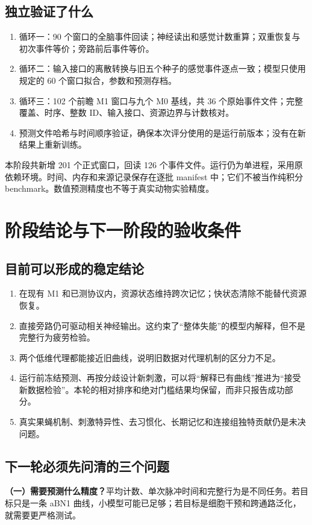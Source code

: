 \documentclass[UTF8,a4paper,zihao=-4,fontset=none]{ctexart}
\begin{document}
\subsection{独立验证了什么}
\begin{enumerate}
\item 循环一：90 个窗口的全脑事件回读；神经读出和感觉计数重算；双重恢复与初次事件等价；旁路前后事件等价。
\item 循环二：输入接口的离散转换与旧五个种子的感觉事件逐点一致；模型只使用规定的 60 个窗口拟合，参数和预测存档。
\item 循环三：102 个前瞻 M1 窗口与九个 M0 基线，共 36 个原始事件文件；完整覆盖、时序、整数 ID、输入接口、资源边界与计数核对。
\item 预测文件哈希与时间顺序验证，确保本次评分使用的是运行前版本；没有在新结果上重新训练。
\end{enumerate}

本阶段共新增 201 个正式窗口，回读 126 个事件文件。运行仍为单进程，采用原依赖环境。时间、内存和来源记录保存在逐批 manifest 中；它们不被当作纯积分 benchmark。数值预测精度也不等于真实动物实验精度。

\section{阶段结论与下一阶段的验收条件}
\subsection{目前可以形成的稳定结论}
\begin{enumerate}
\item 在现有 M1 和已测协议内，资源状态维持跨次记忆；快状态清除不能替代资源恢复。
\item 直接旁路仍可驱动相关神经输出。这约束了“整体失能”的模型内解释，但不是完整行为疲劳检验。
\item 两个低维代理都能接近旧曲线，说明旧数据对代理机制的区分力不足。
\item 运行前冻结预测、再按分歧设计新刺激，可以将“解释已有曲线”推进为“接受新数据检验”。本轮的相对排序和绝对门槛结果均保留，而非只报告成功部分。
\item 真实果蝇机制、刺激特异性、去习惯化、长期记忆和连接组独特贡献仍是未决问题。
\end{enumerate}

\subsection{下一轮必须先问清的三个问题}
\textbf{（一）需要预测什么精度？}平均计数、单次脉冲时间和完整行为是不同任务。若目标只是一条 aBN1 曲线，小模型可能已足够；若目标是细胞干预和跨通路泛化，就需要更严格测试。
\end{document}
